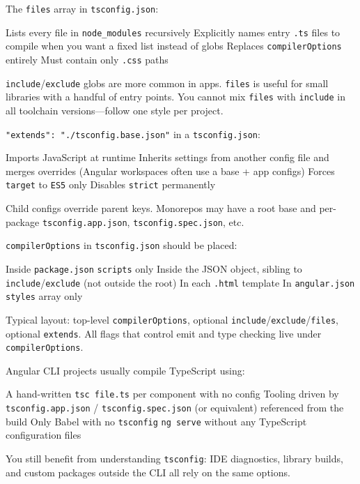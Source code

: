 \question[4]
The \texttt{files} array in \texttt{tsconfig.json}:
\begin{choices}
  \choice Lists every file in \texttt{node\_modules} recursively
  \CorrectChoice Explicitly names entry \texttt{.ts} files to compile when you want a fixed list instead of globs
  \choice Replaces \texttt{compilerOptions} entirely
  \choice Must contain only \texttt{.css} paths
\end{choices}
\begin{solution}
  \texttt{include}/\texttt{exclude} globs are more common in apps. \texttt{files} is useful for small libraries with a handful of entry points. You cannot mix \texttt{files} with \texttt{include} in all toolchain versions---follow one style per project.
\end{solution}

\question[4]
\texttt{"extends": "./tsconfig.base.json"} in a \texttt{tsconfig.json}:
\begin{choices}
  \choice Imports JavaScript at runtime
  \CorrectChoice Inherits settings from another config file and merges overrides (Angular workspaces often use a base + app configs)
  \choice Forces \texttt{target} to \texttt{ES5} only
  \choice Disables \texttt{strict} permanently
\end{choices}
\begin{solution}
  Child configs override parent keys. Monorepos may have a root base and per-package \texttt{tsconfig.app.json}, \texttt{tsconfig.spec.json}, etc.
\end{solution}

\question[4]
\texttt{compilerOptions} in \texttt{tsconfig.json} should be placed:
\begin{choices}
  \choice Inside \texttt{package.json} \texttt{scripts} only
  \CorrectChoice Inside the JSON object, sibling to \texttt{include}/\texttt{exclude} (not outside the root)
  \choice In each \texttt{.html} template
  \choice In \texttt{angular.json} \texttt{styles} array only
\end{choices}
\begin{solution}
  Typical layout: top-level \texttt{compilerOptions}, optional \texttt{include}/\texttt{exclude}/\texttt{files}, optional \texttt{extends}. All flags that control emit and type checking live under \texttt{compilerOptions}.
\end{solution}

\question[4]
Angular CLI projects usually compile TypeScript using:
\begin{choices}
  \choice A hand-written \texttt{tsc file.ts} per component with no config
  \CorrectChoice Tooling driven by \texttt{tsconfig.app.json} / \texttt{tsconfig.spec.json} (or equivalent) referenced from the build
  \choice Only Babel with no \texttt{tsconfig}
  \choice \texttt{ng serve} without any TypeScript configuration files
\end{choices}
\begin{solution}
  You still benefit from understanding \texttt{tsconfig}: IDE diagnostics, library builds, and custom packages outside the CLI all rely on the same options.
\end{solution}

